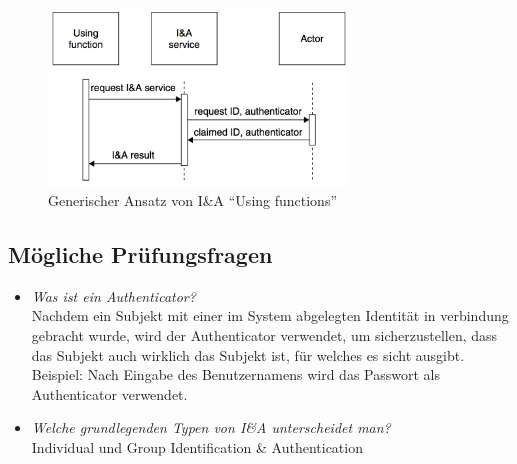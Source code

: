 \begin{figure}[H]
	\centering
	\includegraphics[width=8cm]{content/security/identification-and-authentication/using-functions.png}
	\caption{Generischer Ansatz von I\&A ``Using functions'' \cite{SecPatterns06}}
\end{figure}

\subsection*{Mögliche Prüfungsfragen}
\begin{itemize}
	\item \emph{Was ist ein Authenticator?}\\
	Nachdem ein Subjekt mit einer im System abgelegten Identität in verbindung gebracht wurde, wird der Authenticator verwendet, um sicherzustellen, dass das Subjekt auch wirklich das Subjekt ist, für welches es sicht ausgibt.\\
	Beispiel: Nach Eingabe des Benutzernamens wird das Passwort als Authenticator verwendet.

	\item \emph{Welche grundlegenden Typen von I\&A unterscheidet man?}\\
	Individual und Group Identification \& Authentication
\end{itemize}

